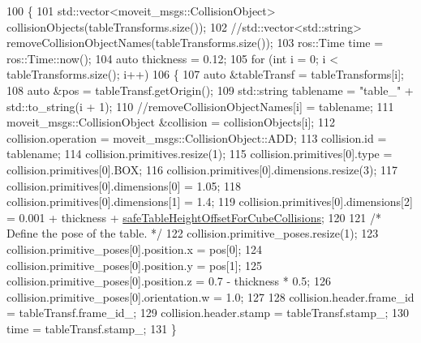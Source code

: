 \begin{DoxyCode}
100                     \{
101                         std::vector<moveit\_msgs::CollisionObject> collisionObjects(tableTransforms.size());
102                         \textcolor{comment}{//std::vector<std::string> removeCollisionObjectNames(tableTransforms.size());}
103                         ros::Time time = ros::Time::now();
104                         \textcolor{keyword}{auto} thickness = 0.12;
105                         \textcolor{keywordflow}{for} (\textcolor{keywordtype}{int} i = 0; i < tableTransforms.size(); i++)
106                         \{
107                             \textcolor{keyword}{auto} &tableTransf = tableTransforms[i];
108                             \textcolor{keyword}{auto} &pos = tableTransf.getOrigin();
109                             std::string tablename = \textcolor{stringliteral}{"table\_"} + std::to\_string(i + 1);
110                             \textcolor{comment}{//removeCollisionObjectNames[i] = tablename;}
111                             moveit\_msgs::CollisionObject &collision = collisionObjects[i];
112                             collision.operation = moveit\_msgs::CollisionObject::ADD;
113                             collision.id = tablename;
114                             collision.primitives.resize(1);
115                             collision.primitives[0].type = collision.primitives[0].BOX;
116                             collision.primitives[0].dimensions.resize(3);
117                             collision.primitives[0].dimensions[0] = 1.05;
118                             collision.primitives[0].dimensions[1] = 1.4;
119                             collision.primitives[0].dimensions[2] = 0.001 + thickness + 
      \hyperlink{classsm__moveit__4_1_1cl__perception__system_1_1CpSimulatedGazeboPerception_a6b6bafbddde1f72c81bf54aa75872151}{safeTableHeightOffsetForCubeCollisions};
120 
121                             \textcolor{comment}{/* Define the pose of the table. */}
122                             collision.primitive\_poses.resize(1);
123                             collision.primitive\_poses[0].position.x = pos[0];
124                             collision.primitive\_poses[0].position.y = pos[1];
125                             collision.primitive\_poses[0].position.z = 0.7 - thickness * 0.5;
126                             collision.primitive\_poses[0].orientation.w = 1.0;
127 
128                             collision.header.frame\_id = tableTransf.frame\_id\_;
129                             collision.header.stamp = tableTransf.stamp\_;
130                             time = tableTransf.stamp\_;
131                         \}

\end{DoxyCode}
